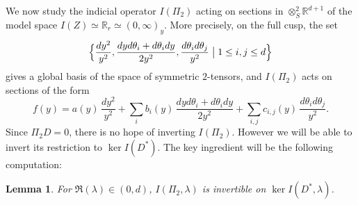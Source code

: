 \documentclass[10pt]{amsart}
\newcommand{\R}{\mathbb{R}}
\theoremstyle{plain}
\newtheorem{lemma}{Lemma}[section]
\theoremstyle{definition}
\begin{document}
We now study the indicial operator $I(\Pi_2)$ acting on sections in $\otimes^2_S \R^{d+1}$ of the model space $I(Z) \simeq \R_r \simeq (0,\infty)_y$. More precisely, on the full cusp, the set
\[
\Bigl\{ \dfrac{dy^2}{y^2}, \dfrac{dyd\theta_i+d\theta_i dy}{2y^2}, \dfrac{d\theta_i d\theta_j}{y^2} \bigm| 1 \leq i,j \leq d \Bigl\}
\]
gives a global basis of the space of symmetric $2$-tensors, and $I(\Pi_2)$ acts on sections of the form
\[
f(y) = a(y)\,\dfrac{dy^2}{y^2} + \sum_i b_i(y)\, \dfrac{dyd\theta_i+d\theta_i dy}{2y^2} + \sum_{i,j} c_{i,j}(y)\, \dfrac{d\theta_id\theta_j}{y^2}.
\]
Since $\Pi_2 D = 0$, there is no hope of inverting $I(\Pi_2)$. However we will be able to invert its restriction to $\ker I(D^\ast)$. The key ingredient will be the following computation:
\begin{lemma}\label{lemma:indicial-computations}
For $\Re(\lambda) \in (0,d)$, $I(\Pi_2, \lambda)$ is invertible on $\ker I(D^\ast,\lambda)$.
\end{lemma}
\end{document}

